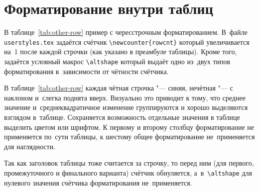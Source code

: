 \section{Форматирование внутри таблиц}\label{app:B3}

В таблице~\ref{tab:other-row} пример с чересстрочным
форматированием. В~файле \verb+userstyles.tex+  задаётся счётчик
\verb+\newcounter{rowcnt}+ который увеличивается на~1 после каждой
строчки (как указано в преамбуле таблицы). Кроме того, задаётся
условный макрос \verb+\altshape+ который выдаёт одно
из~двух типов форматирования в~зависимости от чётности счётчика.

В таблице~\ref{tab:other-row} каждая чётная строчка "--- синяя,
нечётная "--- с наклоном и~слегка поднята вверх. Визуально это приводит
к тому, что среднее значение и~среднеквадратичное изменение
группируются и хорошо выделяются взглядом в~таблице. Сохраняется
возможность отдельные значения в таблице выделить цветом или
шрифтом. К первому и второму столбцу форматирование не применяется
по~сути таблицы, к шестому общее форматирование не~применяется для
наглядности.

Так как заголовок таблицы тоже считается за строчку, то перед ним (для
первого, промежуточного и финального варианта) счётчик обнуляется,
а~в~\verb+\altshape+ для нулевого значения счётчика форматирования
не~применяется.

